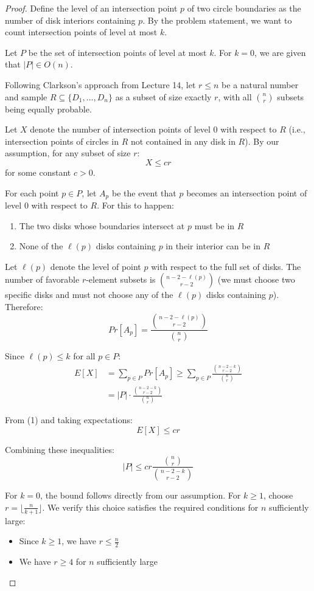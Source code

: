 \documentclass{article}
\begin{document}
  \begin{proof}
Define the level of an intersection point $p$ of two circle boundaries as the number of disk interiors containing $p$. By the problem statement, we want to count intersection points of level at most $k$.

Let $P$ be the set of intersection points of level at most $k$. For $k = 0$, we are given that $|P| \in O(n)$.

Following Clarkson's approach from Lecture 14, let $r \leq n$ be a natural number and sample $R \subseteq \{D_1, \ldots, D_n\}$ as a subset of size exactly $r$, with all $\binom{n}{r}$ subsets being equally probable.

Let $X$ denote the number of intersection points of level 0 with respect to $R$ (i.e., intersection points of circles in $R$ not contained in any disk in $R$). By our assumption, for any subset of size $r$:
\[X \leq cr \tag{1}\]
for some constant $c > 0$.

For each point $p \in P$, let $A_p$ be the event that $p$ becomes an intersection point of level 0 with respect to $R$. For this to happen:
\begin{enumerate}
\item The two disks whose boundaries intersect at $p$ must be in $R$
\item None of the $\ell(p)$ disks containing $p$ in their interior can be in $R$
\end{enumerate}

Let $\ell(p)$ denote the level of point $p$ with respect to the full set of disks. The number of favorable $r$-element subsets is $\binom{n-2-\ell(p)}{r-2}$ (we must choose two specific disks and must not choose any of the $\ell(p)$ disks containing $p$). Therefore:
\[Pr[A_p] = \frac{\binom{n-2-\ell(p)}{r-2}}{\binom{n}{r}}\]

Since $\ell(p) \leq k$ for all $p \in P$:
\begin{align*}
E[X] &= \sum_{p \in P} Pr[A_p] \geq \sum_{p \in P} \frac{\binom{n-2-k}{r-2}}{\binom{n}{r}} \\
&= |P| \cdot \frac{\binom{n-2-k}{r-2}}{\binom{n}{r}}
\end{align*}

From (1) and taking expectations:
\[E[X] \leq cr\]

Combining these inequalities:
\[|P| \leq cr\frac{\binom{n}{r}}{\binom{n-2-k}{r-2}}\]

For $k = 0$, the bound follows directly from our assumption. For $k \geq 1$, choose $r = \lfloor\frac{n}{k+1}\rfloor$. We verify this choice satisfies the required conditions for $n$ sufficiently large:
\begin{itemize}
\item Since $k \geq 1$, we have $r \leq \frac{n}{2}$
\item We have $r \geq 4$ for $n$ sufficiently large
\end{itemize}


\end{proof}
\end{document}
